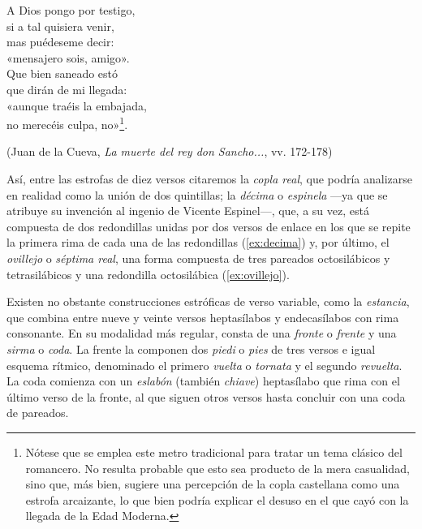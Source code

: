 \begin{exe}
	\ex\label{ex:coplacastellana}A Dios pongo por testigo,\\
	si a tal quisiera venir,\\
	mas puédeseme decir:\\
	«mensajero sois, amigo».\\
	Que bien saneado estó\\
	que dirán de mi llegada:\\
	«aunque traéis la embajada,\\
	no merecéis culpa, no»\footnote{Nótese que se emplea este metro tradicional para tratar un tema clásico del romancero. No resulta probable que esto sea producto de la mera casualidad, sino que, más bien, sugiere una percepción de la copla castellana como una estrofa arcaizante, lo que bien podría explicar el desuso en el que cayó con la llegada de la Edad Moderna.}.\\	
	\strut\hfill(Juan de la Cueva, \textit{La muerte del rey don Sancho...}, vv. 172-178\nocite{mena_muertereysancho})
\end{exe}

 Así, entre las estrofas de diez versos citaremos la \textit{copla real}, que podría analizarse en realidad como la unión de dos quintillas; la \textit{décima} o \textit{espinela} —ya que se atribuye su invención al ingenio de  Vicente Espinel—, que, a su vez, está compuesta de dos redondillas unidas por dos versos de enlace en los que se repite la primera rima de cada una de las redondillas (\ref{ex:decima}) y, por último, el \textit{ovillejo} o \textit{séptima real}, una forma compuesta de tres pareados octosilábicos y tetrasilábicos y una redondilla octosilábica (\ref{ex:ovillejo}).
 
 Existen no obstante construcciones estróficas de verso variable, como la \textit{estancia}, que combina entre nueve y veinte versos heptasílabos y endecasílabos con rima consonante. En su modalidad más regular, consta de una \textit{fronte} o \textit{frente} y una \textit{sirma} o \textit{coda}. La frente la componen dos \textit{piedi} o \textit{pies} de tres versos e igual esquema rítmico, denominado el primero \textit{vuelta} o \textit{tornata} y el segundo \textit{revuelta}. La coda comienza con un \textit{eslabón}  (también \textit{chiave}) heptasílabo que rima con el último verso de la fronte, al que siguen otros versos hasta concluir con una coda de pareados. 

